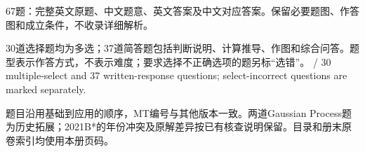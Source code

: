 
67题：完整英文原题、中文题意、英文答案及中文对应答案。保留必要题图、作答图和成立条件，不收录详细解析。


30道选择题均为多选；37道简答题包括判断说明、计算推导、作图和综合问答。题型表示作答方式，不表示难度；要求选择不正确选项的题另标“选错”。 / 30 multiple-select and 37 written-response questions; select-incorrect questions are marked separately.


题目沿用基础到应用的顺序，MT编号与其他版本一致。两道Gaussian Process题为历史拓展；2021B*的年份冲突及原解差异按已有核查说明保留。目录和册末原卷索引均使用本册页码。
